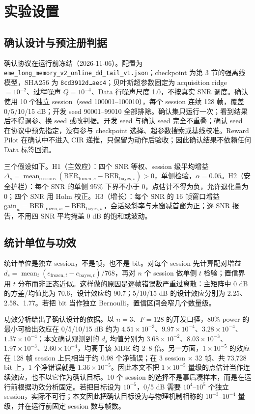 \section{实验设置}

\subsection{确认设计与预注册判据}

确认协议在运行前冻结（2026-11-06）。配置为 \texttt{eme\_long\_memory\_v2\_online\_dd\_tail\_v1.json}；checkpoint 为第 3 节的强离线模型，SHA256 为 \texttt{8cd3912d…aec4}；贝叶斯超参数固定为 acquisition ridge $=10^{-2}$、过程噪声 $Q=10^{-4}$、Data 行噪声尺度 1.0，不按真实 SNR 调度。确认使用 10 个独立 session（seed 100001–100010），每个 session 连续 128 帧，覆盖 0/5/10/15 dB；开发 seed 90001–99010 全部排除。确认集只运行一次；看到结果后不得调参、换 seed 或改判据。开发 seed 与确认 seed 完全不重叠；确认 seed 在协议中预先指定，没有参与 checkpoint 选择、超参数搜索或基线校准。Reward Pilot 在确认中不进入 CIR 递推，只保留为动作后验收；因此确认结果不依赖任何 Data 标签回流。

三个假设如下。H1（主效应）：四个 SNR 等权、session 级平均增益$\Delta_s=\operatorname{mean}_{\mathrm{sessions}}(\mathrm{BER}_{\mathrm{frozen},s}-\mathrm{BER}_{\mathrm{bayes},s})>0$，单侧检验，$\alpha=0.05$。H2（安全护栏）：每个 SNR 的单侧 95\% 下界不小于 0，点估计不得为负，允许退化量为 0；四个 SNR 用 Holm 校正。H3（增长）：每个 SNR 的 16 帧窗口增益$\mathrm{gain}_w=\mathrm{BER}_{\mathrm{frozen},w}-\mathrm{BER}_{\mathrm{bayes},w}$，会话级斜率与末窗减首窗为正；逐 SNR 报告，不用四 SNR 平均掩盖 0 dB 的饱和或波动。

\subsection{统计单位与功效}

统计单位是独立 session，不是帧，也不是 bit。对每个 session 先计算配对增益$d_s=\operatorname{mean}_t(e_{\mathrm{frozen},t}-e_{\mathrm{bayes},t})/768$，再对 $n$ 个 session 做单侧 $t$ 检验；置信界用 $t$ 分布而非正态近似。这样做的原因是逐帧错误数严重过离散：主矩阵中 0 dB 的方差/均值比为 70.6，设计效应约 90.7；5/10/15 dB 的设计效应分别为 2.25、2.58、1.77。若把 bit 当作独立 Bernoulli，置信区间会窄几个数量级。

功效分析给出了确认设计的依据。以 $n=3$、$F=128$ 的开发口径，80\% power 的最小可检出效应在 0/5/10/15 dB 约为 $4.51\times10^{-3}$、$9.97\times10^{-4}$、$3.28\times10^{-4}$、$1.37\times10^{-4}$；本文确认观测到的 $d_s$ 均值分别为 $3.68\times10^{-2}$、$8.03\times10^{-3}$、$1.97\times10^{-3}$、$2.60\times10^{-4}$，均高于该 MDE 约 2–8 倍。另一方面，$1\times10^{-5}$ 的效应在 128 帧 session 上只相当于约 0.98 个净错误；在 3 session × 32 帧、共 73,728 bit 上，1 个净错误就是 $1.36\times10^{-5}$。因此本文不把 $1\times10^{-5}$ 量级的点估计当作连续效应，也不以它作为确认目标。10 个 session 的选择不是事后凑样本，而是在运行前根据功效分析固定。若把目标设为 $10^{-5}$，0/5 dB 需要 $10^{4}$–$10^{5}$ 个独立 session，实际不可行；本文因此把确认目标设为与物理机制相称的 $10^{-3}$–$10^{-4}$ 量级，并在运行前固定 session 数与帧数。

